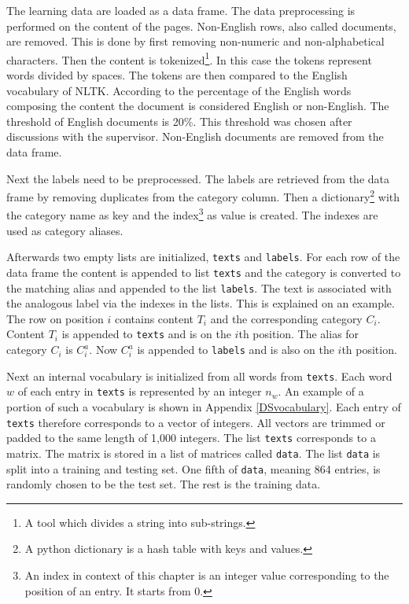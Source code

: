 The learning data are loaded as a data frame. The data preprocessing is performed on the content of the pages. Non-English rows, also called documents, are removed. This is done by first removing non-numeric and non-alphabetical characters. Then the content is tokenized\footnote{A tool which divides a string into sub-strings.}. In this case the tokens represent words divided by spaces. The tokens are then compared to the English vocabulary of NLTK. According to the percentage of the English words composing the content the document is considered English or non-English. The threshold of English documents is 20\%. This threshold was chosen after discussions with the supervisor. Non-English documents are removed from the data frame.

Next the labels need to be preprocessed. The labels are retrieved from the data frame by removing duplicates from the category column. Then a dictionary\footnote{A python dictionary is a hash table with keys and values.} with the category name as key and the index\footnote{An index in context of this chapter is an integer value corresponding to the position of an entry. It starts from 0.} as value is created. The indexes are used as category aliases. 

Afterwards two empty lists are initialized, \texttt{texts} and \texttt{labels}. For each row of the data frame the content is appended to list \texttt{texts} and the category is converted to the matching alias and appended to the list \texttt{labels}. The text is associated with the analogous label via the indexes in the lists.  This is explained on an example. The row on position $i$ contains content $T_i$ and the corresponding category $C_i$. Content $T_i$ is appended to \texttt{texts} and is on the $i$th position. The alias for category $C_i$ is $C^a_i$. Now $C^a_i$ is appended to \texttt{labels} and is also on the $i$th position.

Next an internal vocabulary is initialized from all words from \texttt{texts}. Each word $w$ of each entry in \texttt{texts} is represented by an integer $n_w$. An example of a portion of such a vocabulary is shown in Appendix \ref{DSvocabulary}. Each entry of \texttt{texts} therefore corresponds to a vector of integers. All vectors are trimmed or padded to the same length of 1,000 integers. The list \texttt{texts} corresponds to a matrix. The matrix is stored in a list of matrices called \texttt{data}. The list \texttt{data} is split into a training and testing set. One fifth of \texttt{data}, meaning 864 entries, is randomly chosen to be the test set. The rest is the training data.

